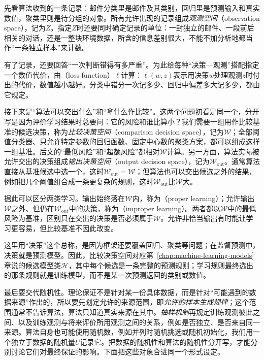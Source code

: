 先看算法收到的一条记录：邮件分类里是邮件及其类别，回归里是预测输入和真实数值，聚类里则是待分组的对象。所有允许出现的记录组成\emph{观测空间}（observation space），记为$Z$。指定$Z$时还要同时确定记录的单位：一封独立的邮件、一段前后相关的对话，还是一整块环境数据，所含的信息差别很大，不能不加分析地都当作“一条独立样本”来计数。

有了记录，还要回答“一次判断错得有多严重”。为此给每种“决策—观测”搭配指定一个数值代价，由（loss function）$\ell$计算：$\ell(w,z)$表示用决策$w$处理观测$z$时付出的代价，数值越小越好。分类中错分一次记多少、回归中偏差多大记多少，都由它规定。

接下来是“算法可以交出什么”和“拿什么作比较”。这两个问题初看是同一个，分开写是因为评价学习结果时总要问：它的风险和谁比算小？我们需要一组用作比较基准的候选决策，称为\emph{比较决策空间}（comparison decision space），记为$\mathcal W$；全部阈值分类器、只允许特定参数的回归函数、固定中心数的聚类方案，都可以组成这样一组基准。后文的“最低风险”和“超额风险”都相对$\mathcal W$计算。另一方面，算法实际被允许交出的决策组成\emph{输出决策空间}（output decision space），记为$\mathcal W_{\mathrm{out}}$。通常算法直接从基准候选中选一个，这时$\mathcal W_{\mathrm{out}}=\mathcal W$；但算法也可以交出候选之外的结果，例如把几个阈值组合成一条更复杂的规则，这时$\mathcal W_{\mathrm{out}}$比$\mathcal W$大。

据此可以区分两类学习。输出始终落在$\mathcal W$内，称为（proper learning）；允许输出$\mathcal W$之外、但仍在$\mathcal W_{\mathrm{out}}$中的决策，称为（improper learning）。两者都以$\mathcal W$中的最低风险为基准，区别只在交出的决策是否必须属于$\mathcal W$。允许非恰当输出有时能让学习更容易，但比较基准不因此改变。

这里用“决策”这个总称，是因为框架还要覆盖回归、聚类等问题；在监督预测中，决策就是预测模型。因此，比较决策空间对应第~\ref{chap:machine-learning-models}章说的候选模型类$\mathcal H$，其中每个候选是一条完整的预测规则；学习规则最终选出的那条规则就是训练模型，而不是某一次预测返回的类别或数值。

最后要交代随机性。理论保证不是针对某一份具体数据，而是针对“可能遇到的数据来源”作出的，所以要先划定允许的来源范围，即\emph{允许的样本生成规律}；这个范围通常不告诉算法，算法只知道真实来源在其中。\emph{抽样机制}再规定训练观测彼此之间、以及训练观测与将来评价所用观测之间的关系，例如是否独立、是否来自同一来源。算法自身也可能使用随机数，例如并列时随机挑选或随机初始化，我们用一个独立于数据的随机量$U$记录它。把数据的随机性和算法的随机性分开写，才能分别讨论它们对最终保证的影响。下面把这些对象合进同一个形式设定。

